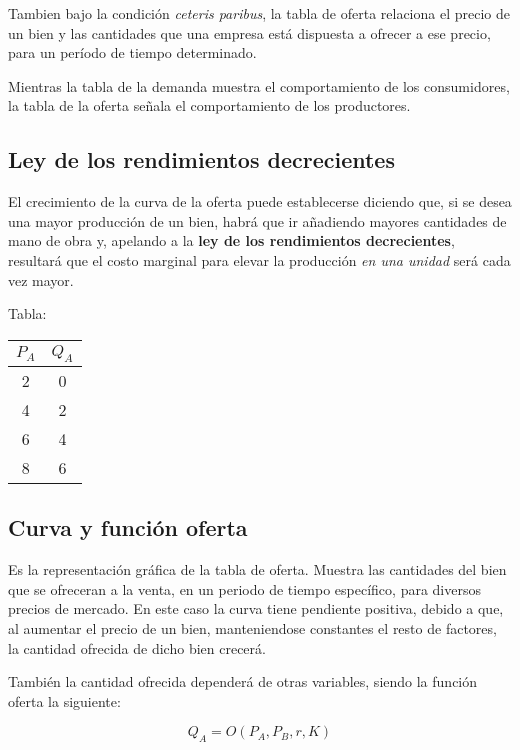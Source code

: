 Tambien bajo la condición \textit{ceteris paribus},
la tabla de oferta relaciona el precio de un bien
y las cantidades que una empresa está dispuesta a ofrecer a ese precio,
para un período de tiempo determinado.

Mientras la tabla de la demanda muestra el comportamiento de los consumidores,
la tabla de la oferta señala el comportamiento de los productores.

\subsection{Ley de los rendimientos decrecientes}

El crecimiento de la curva de la oferta puede establecerse diciendo que,
si se desea una mayor producción de un bien,
habrá que ir añadiendo mayores cantidades de mano de obra y,
apelando a la \textbf{ley de los rendimientos decrecientes},
resultará que el costo marginal para elevar 
la producción \textit{en una unidad} será cada vez mayor.

Tabla:
\begin{table}[H]
    \centering
    \begin{tabular}{c c}
        \hline
        \( P_A\) & \(Q_A\) \\
        \hline
        2        & 0       \\
        4        & 2       \\
        6        & 4       \\
        8        & 6       \\
        \hline
    \end{tabular}
\end{table}

\subsection{Curva y función oferta}

Es la representación gráfica de la tabla de oferta.
Muestra las cantidades del bien que se ofreceran a la venta,
en un periodo de tiempo específico,
para diversos precios de mercado.
En este caso la curva tiene pendiente positiva,
debido a que,
al aumentar el precio de un bien,
manteniendose constantes el resto de factores,
la cantidad ofrecida de dicho bien crecerá.

También la cantidad ofrecida dependerá de otras variables,
siendo la función oferta la siguiente:

\begin{equation*}
    Q_A = O(P_A, P_B, r, K)
\end{equation*}

